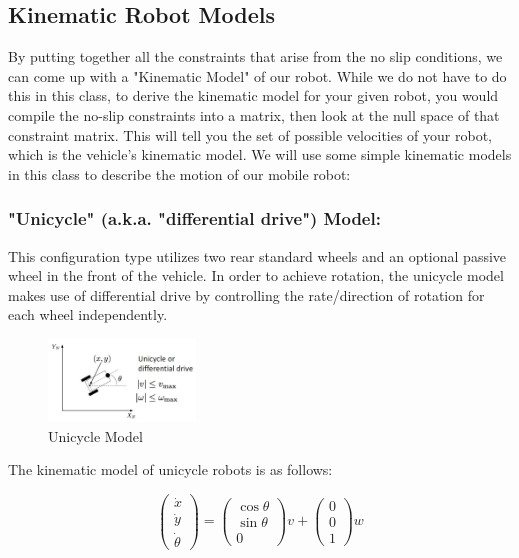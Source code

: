 \documentclass[twoside]{article}
\begin{document}
\subsection*{Kinematic Robot Models}

By putting together all the constraints that arise from the no slip conditions, we can come up with a "Kinematic Model" of our robot. While we do not have to do this in this class, to derive the kinematic model for your given robot, you would compile the no-slip constraints into a matrix, then look at the null space of that constraint matrix. This will tell you the set of possible velocities of your robot, which is the vehicle's kinematic model. We will use some simple kinematic models in this class to describe the motion of our mobile robot:

\subsubsection*{"Unicycle" (a.k.a. "differential drive") Model:}

This configuration type utilizes two rear standard wheels and an optional passive wheel in the front of the vehicle. In order to achieve rotation, the unicycle model makes use of differential drive by controlling the rate/direction of rotation for each wheel independently\cite{sns}.

\begin{figure}[H]
\centering
\includegraphics[width=0.35\textwidth]{unicycle}
\caption{Unicycle Model}
\end{figure}

The kinematic model of unicycle robots is as follows:

\[ \begin{pmatrix}
\dot{x} \\ \dot{y} \\ \dot{\theta}
\end{pmatrix} =
\begin{pmatrix} \cos \theta \\ \sin \theta \\ 0 \end{pmatrix} v + \begin{pmatrix} 0 \\ 0 \\ 1 \end{pmatrix} w
\]
\end{document}

